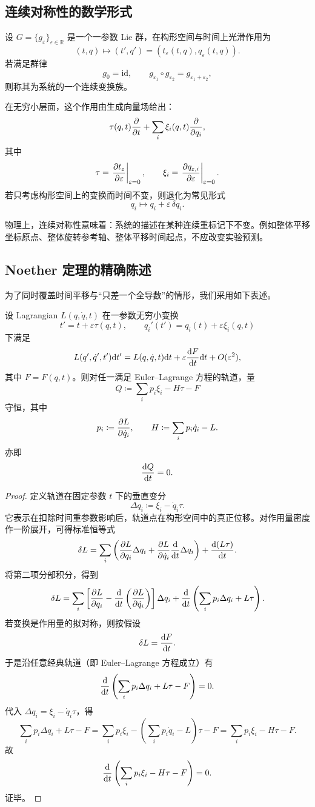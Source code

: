 \subsection{连续对称性的数学形式}

\begin{definition}
设 $G=\{g_\varepsilon\}_{\varepsilon\in\mathbb R}$ 是一个一参数 Lie 群，在构形空间与时间上光滑作用为
\[
  (t,q)\longmapsto (t',q')=(t_\varepsilon(t,q),q_\varepsilon(t,q)).
\]
若满足群律
\[
  g_0=\mathrm{id},\qquad g_{\varepsilon_1}\circ g_{\varepsilon_2}=g_{\varepsilon_1+\varepsilon_2},
\]
则称其为系统的一个连续变换族。
\end{definition}

在无穷小层面，这个作用由生成向量场给出：
\[
  \tau(q,t)\pdv{}{t}+\sum_i \xi_i(q,t)\pdv{}{q_i},
\]
其中
\[
  \tau=\eval{\pdv{t_\varepsilon}{\varepsilon}}_{\varepsilon=0},
  \qquad
  \xi_i=\eval{\pdv{q_{\varepsilon,i}}{\varepsilon}}_{\varepsilon=0}.
\]
若只考虑构形空间上的变换而时间不变，则退化为常见形式
\[
  q_i\longmapsto q_i+\varepsilon\,\delta q_i.
\]

物理上，连续对称性意味着：系统的描述在某种连续重标记下不变。例如整体平移坐标原点、整体旋转参考轴、整体平移时间起点，不应改变实验预测。

\subsection{Noether 定理的精确陈述}

为了同时覆盖时间平移与“只差一个全导数”的情形，我们采用如下表述。

\begin{theorem}[Noether 定理]
设 Lagrangian $L(q,\dot q,t)$ 在一参数无穷小变换
\[
  t' = t+\varepsilon\tau(q,t),
  \qquad
  q_i'(t')=q_i(t)+\varepsilon\xi_i(q,t)
\]
下满足
\[
  L(q',\dot q',t')\dd t' = L(q,\dot q,t)\dd t + \varepsilon \dv{F}{t}\dd t + O(\varepsilon^2),
\]
其中 $F=F(q,t)$。则对任一满足 Euler--Lagrange 方程的轨道，量
\[
  Q\coloneqq \sum_i p_i\xi_i-H\tau-F
\]
守恒，其中
\[
  p_i\coloneqq \pdv{L}{\dot q_i},
  \qquad
  H\coloneqq \sum_i p_i\dot q_i-L.
\]
亦即
\[
  \dv{Q}{t}=0.
\]
\end{theorem}

\begin{proof}
定义轨道在固定参数 $t$ 下的垂直变分
\[
  \Delta q_i\coloneqq \xi_i-\dot q_i\tau.
\]
它表示在扣除时间重参数影响后，轨道点在构形空间中的真正位移。对作用量密度作一阶展开，可得标准恒等式
\[
  \delta L
  =\sum_i\left(\pdv{L}{q_i}\Delta q_i+\pdv{L}{\dot q_i}\dv{}{t}\Delta q_i\right)
  +\dv{(L\tau)}{t}.
\]
将第二项分部积分，得到
\[
  \delta L
  =\sum_i\left[\pdv{L}{q_i}-\dv{}{t}\left(\pdv{L}{\dot q_i}\right)\right]\Delta q_i
  +\dv{}{t}\left(\sum_i p_i\Delta q_i + L\tau\right).
\]
若变换是作用量的拟对称，则按假设
\[
  \delta L=\dv{F}{t}.
\]
于是沿任意经典轨道（即 Euler--Lagrange 方程成立）有
\[
  \dv{}{t}\left(\sum_i p_i\Delta q_i + L\tau -F\right)=0.
\]
代入 $\Delta q_i=\xi_i-\dot q_i\tau$，得
\[
  \sum_i p_i\Delta q_i + L\tau -F
  =\sum_i p_i\xi_i-\left(\sum_i p_i\dot q_i-L\right)\tau-F
  =\sum_i p_i\xi_i-H\tau-F.
\]
故
\[
  \dv{}{t}\left(\sum_i p_i\xi_i-H\tau-F\right)=0.
\]
证毕。
\end{proof}

